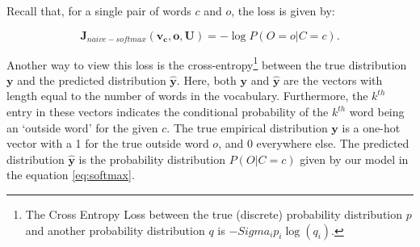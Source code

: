 \documentclass{article}
\begin{document}
	Recall that, for a single pair of words $c$ and $o$, the loss is given by:
	
	\begin{equation}
		\bm{J}_{naive-softmax}\bm{(v_c, o, U)} = -\log{P(O=o|C=c)}.
	\end{equation}
	
	Another way to view this loss is the cross-entropy\footnote{The Cross Entropy Loss between the true (discrete) probability distribution $p$ and another probability distribution $q$ is $-Sigma_{i} p_i \log{(q_i)}$.} between the true distribution $\bm{y}$ and the predicted distribution $\hat{\bm{y}}$. Here, both $\bm{y}$ and $\bm{\hat{y}}$ are the vectors with length equal to the number of words in the vocabulary. Furthermore, the $k^{th}$ entry in these vectors indicates the conditional probability of the $k^{th}$ word being an `outside word' for the given $c$. The true empirical distribution $\bm{y}$ is a one-hot vector with a 1 for the true outside word $o$, and 0 everywhere else. The predicted distribution $\hat{\bm{y}}$ is the probability distribution $P(O|C=c)$ given by our model in the equation \ref{eq:softmax}. 
	
	
	
\end{document}
